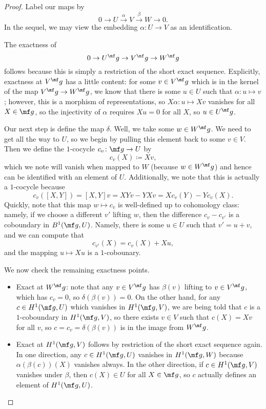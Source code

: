 \documentclass[../notes.tex]{subfiles}
\begin{document}
\begin{proof}
	Label our maps by
	\[0\to U\stackrel\alpha\to V\stackrel\beta\to W\to0.\]
	In the sequel, we may view the embedding $\alpha\colon U\to V$ as an identification.

	The exactness of
	\[0\to U^\mf g\to V^\mf g\to W^\mf g\]
	follows because this is simply a restriction of the short exact sequence. Explicitly, exactness at $V^\mf g$ has a little content: for some $v\in V^\mf g$ which is in the kernel of the map $V^\mf g\to W^\mf g$, we know that there is some $u\in U$ such that $\alpha\colon u\mapsto v$; however, this is a morphism of representations, so $X\alpha\colon u\mapsto Xv$ vanishes for all $X\in\mf g$, so the injectivity of $\alpha$ requires $Xu=0$ for all $X$, so $u\in U^\mf g$.

	Our next step is define the map $\delta$. Well, we take some $w\in W^\mf g$. We need to get all the way to $U$, so we begin by pulling this element back to some $v\in V$. Then we define the $1$-cocycle $c_v\colon\mf g\to U$ by
	\[c_v(X)\coloneqq Xv,\]
	which we note will vanish when mapped to $W$ (because $w\in W^\mf g$) and hence can be identified with an element of $U$. Additionally, we note that this is actually a $1$-cocycle because
	\[c_v([X,Y])=[X,Y]v=XYv-YXv=Xc_v(Y)-Yc_v(X).\]
	Quickly, note that this map $w\mapsto c_v$ is well-defined up to cohomology class: namely, if we choose a different $v'$ lifting $w$, then the difference $c_v-c_{v'}$ is a coboundary in $B^1(\mf g,U)$. Namely, there is some $u\in U$ such that $v'=u+v$, and we can compute that
	\[c_{v'}(X)=c_v(X)+Xu,\]
	and the mapping $u\mapsto Xu$ is a $1$-cobounary.

	We now check the remaining exactness points.
	\begin{itemize}
		\item Exact at $W^\mf g$: note that any $v\in V^\mf g$ has $\beta(v)$ lifting to $v\in V^\mf g$, which has $c_v=0$, so $\delta(\beta(v))=0$. On the other hand, for any $c\in H^1(\mf g,U)$ which vanishes in $H^1(\mf g,V)$, we are being told that $c$ is a $1$-coboundary in $H^1(\mf g,V)$, so there exists $v\in V$ such that $c(X)=Xv$ for all $v$, so $c=c_v=\delta(\beta(v))$ is in the image from $W^\mf g$.
		\item Exact at $H^1(\mf g,V)$ follows by restriction of the short exact sequence again. In one direction, any $c\in H^1(\mf g,U)$ vanishes in $H^1(\mf g,W)$ because $\alpha(\beta(c))(X)$ vanishes always. In the other direction, if $c\in H^1(\mf g,V)$ vanishes under $\beta$, then $c(X)\in U$ for all $X\in\mf g$, so $c$ actually defines an element of $H^1(\mf g,U)$.
		\qedhere
	\end{itemize}
\end{proof}
\end{document}

